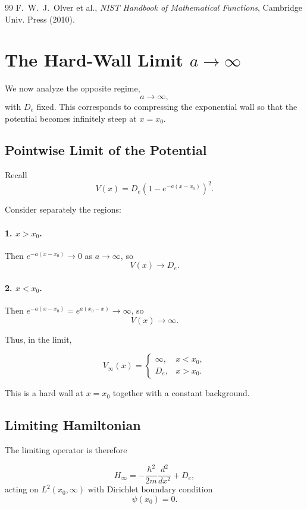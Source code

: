 \documentclass[11pt]{article}
\begin{document}
\begin{thebibliography}{99}
F.~W.~J.~Olver et al.,
\textit{NIST Handbook of Mathematical Functions},
Cambridge Univ. Press (2010).
\end{thebibliography}


\section{The Hard-Wall Limit $a\to\infty$}

We now analyze the opposite regime,
\[
a \to \infty,
\]
with $D_e$ fixed.
This corresponds to compressing the exponential wall so that
the potential becomes infinitely steep at $x=x_0$.

\subsection{Pointwise Limit of the Potential}

Recall
\[
V(x)
=
D_e\left(1-e^{-a(x-x_0)}\right)^2.
\]

Consider separately the regions:

\paragraph{1. $x>x_0$.}
Then $e^{-a(x-x_0)}\to 0$ as $a\to\infty$,
so
\[
V(x)\to D_e.
\]

\paragraph{2. $x<x_0$.}
Then $e^{-a(x-x_0)}=e^{a(x_0-x)}\to\infty$,
so
\[
V(x)\to\infty.
\]

Thus, in the limit,

\[
V_\infty(x)
=
\begin{cases}
\infty, & x<x_0,\\[6pt]
D_e, & x>x_0.
\end{cases}
\]

This is a hard wall at $x=x_0$ together with a constant background.

\subsection{Limiting Hamiltonian}

The limiting operator is therefore

\[
H_\infty
=
-\frac{\hbar^2}{2m}\frac{d^2}{dx^2}
+
D_e,
\]
acting on $L^2(x_0,\infty)$
with Dirichlet boundary condition
\[
\psi(x_0)=0.
\]
\end{document}
